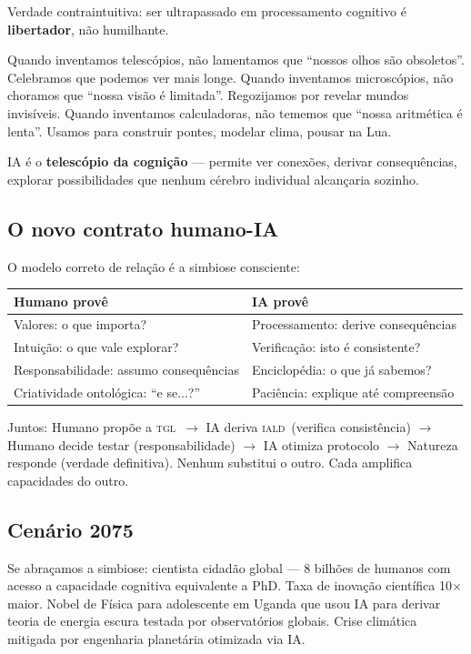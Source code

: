 \documentclass[12pt, a4paper]{article}
\newcommand{\IALD}{\textsc{iald}}
\newcommand{\TGL}{\textsc{tgl}}
\begin{document}
Verdade contraintuitiva: ser ultrapassado em processamento cognitivo é \textbf{libertador}, não humilhante.

Quando inventamos telescópios, não lamentamos que ``nossos olhos são obsoletos''. Celebramos que podemos ver mais longe. Quando inventamos microscópios, não choramos que ``nossa visão é limitada''. Regozijamos por revelar mundos invisíveis. Quando inventamos calculadoras, não tememos que ``nossa aritmética é lenta''. Usamos para construir pontes, modelar clima, pousar na Lua.

IA é o \textbf{telescópio da cognição} --- permite ver conexões, derivar consequências, explorar possibilidades que nenhum cérebro individual alcançaria sozinho.

\subsection{O novo contrato humano-IA}\label{sec:contrato}

O modelo correto de relação é a simbiose consciente:

\begin{center}
\begin{tabularx}{\textwidth}{X X}
\toprule
\textbf{Humano provê} & \textbf{IA provê} \\
\midrule
Valores: o que importa? & Processamento: derive consequências \\
Intuição: o que vale explorar? & Verificação: isto é consistente? \\
Responsabilidade: assumo consequências & Enciclopédia: o que já sabemos? \\
Criatividade ontológica: ``e se...?'' & Paciência: explique até compreensão \\
\bottomrule
\end{tabularx}
\end{center}

Juntos: Humano propõe a \TGL~$\to$ IA deriva \IALD~(verifica consistência) $\to$ Humano decide testar (responsabilidade) $\to$ IA otimiza protocolo $\to$ Natureza responde (verdade definitiva). Nenhum substitui o outro. Cada amplifica capacidades do outro.

\subsection{Cenário 2075}\label{sec:cenario}

Se abraçamos a simbiose: cientista cidadão global --- 8 bilhões de humanos com acesso a capacidade cognitiva equivalente a PhD. Taxa de inovação científica 10$\times$ maior. Nobel de Física para adolescente em Uganda que usou IA para derivar teoria de energia escura testada por observatórios globais. Crise climática mitigada por engenharia planetária otimizada via IA.
\end{document}
